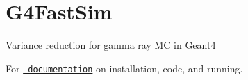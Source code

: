 \chapter{G4\+Fast\+Sim}
\hypertarget{md_README}{}\label{md_README}
\label{md_README_autotoc_md0}%
%
Variance reduction for gamma ray MC in Geant4

For \href{https://g4fastsim.readthedocs.io/}{\texttt{ documentation}} on installation, code, and running. 